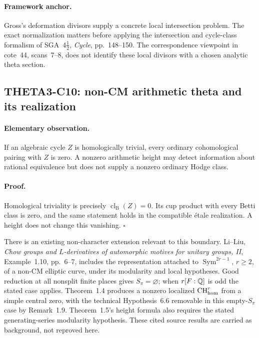 \paragraph{Framework anchor.}
Gross's deformation divisors supply a concrete local intersection problem.
The exact normalization matters before applying the intersection and
cycle-class formalism of SGA~4$\frac12$, \emph{Cycle}, pp.~148--150.
The correspondence viewpoint in cote~44, scans~7--8, does not identify
these local divisors with a chosen analytic theta section.

\subsection{THETA3-C10: non-CM arithmetic theta and its realization}\label{C10}

\paragraph{Elementary observation.}
If an algebraic cycle $Z$ is homologically trivial, every ordinary
cohomological pairing with $Z$ is zero. A nonzero arithmetic height
may detect information about rational equivalence but does not
supply a nonzero ordinary Hodge class.

\paragraph{Proof.}
Homological triviality is precisely
$\operatorname{cl}_{\mathrm B}(Z)=0$. Its cup product with every
Betti class is zero, and the same statement holds in the compatible
\'etale realization. A height does not change this vanishing.
$\square$

There is an existing non-character extension relevant to this
boundary. Li--Liu, \emph{Chow groups and $L$-derivatives of
automorphic motives for unitary groups, II}, Example~1.10,
pp.~6--7, includes the representation attached to
$\operatorname{Sym}^{2r-1}$, $r\geq2$, of a non-CM elliptic curve,
under its modularity and local hypotheses. Good reduction at all
nonsplit finite places gives $S_\pi=\varnothing$; when
$r[F:\mathbb Q]$ is odd the stated case applies. Theorem~1.4 produces a
nonzero localized $\operatorname{CH}^r_{\mathrm{hom}}$ from a simple central zero,
with the technical Hypothesis~6.6 removable in this empty-$S_\pi$
case by Remark~1.9. Theorem~1.5's height formula also requires the
stated generating-series modularity hypothesis. These cited source
results are carried as background, not reproved here.

